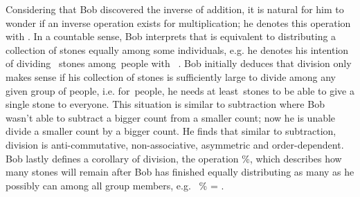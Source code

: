 \documentclass[a4paper,10pt]{article}
\newcommand{\three}{{\raisebox{-0.7ex}{\LARGE\starg{e}}}}
\newcommand{\four}{{\raisebox{-0.7ex}{\LARGE\starg{d}}}}
\newcommand{\six}{{\raisebox{-0.7ex}{\LARGE\starg{j}}}}
\newcommand{\seven}{{\raisebox{-0.7ex}{\LARGE\starg{y}}}}
\begin{document}
\begin{flushleft}
{{	Considering that Bob discovered the inverse of addition, it is natural for him to wonder if an inverse operation exists for multiplication; he denotes this operation with {\div}. In a countable sense, Bob interprets that {} is equivalent to distributing a collection of stones equally among some individuals, e.g. he denotes his intention of dividing {\seven\,\three} stones among {\six\;\,}people with {\seven\,\three} {\div} {\six}. Bob initially deduces that division only makes sense if his collection of stones is sufficiently large to divide among any given group of people, i.e. for {\six\;\,}people, he needs at least {\six\;\,}stones to be able to give a single stone to everyone. This situation is similar to subtraction where Bob wasn't able to subtract a bigger count from a smaller count; now he is unable divide a smaller count by a bigger count. He finds that similar to subtraction, division is anti-commutative, non-associative, asymmetric and order-dependent. Bob lastly defines a corollary of division, the {} operation {\%}, which describes how many stones will remain after Bob has finished equally distributing as many as he possibly can among all group members, e.g. {\seven\,\three} {\%} {\six} = {\four}. 
	\linebreak\linebreak\linebreak
	}}
	\textbf{\Large{}}\linebreak\linebreak

\end{flushleft}
\end{document}
